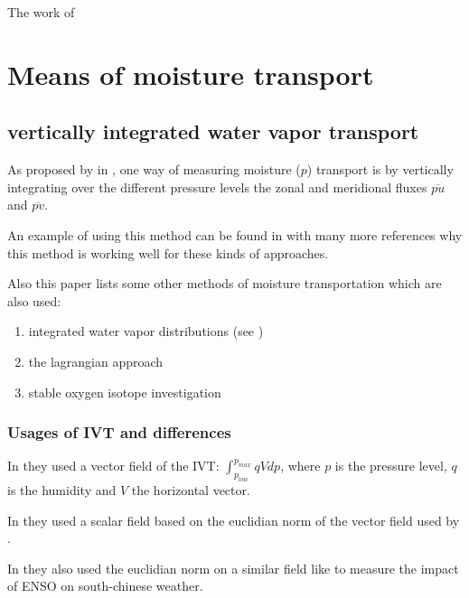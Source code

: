 The work of \citeauthor{precipitation_seasonality}

\section{Means of moisture transport}

\subsection{vertically integrated water vapor transport}

As proposed by \citeauthor{AProposedAlgorithmforMoistureFluxesfromAtmosphericRivers} in \cite{AProposedAlgorithmforMoistureFluxesfromAtmosphericRivers}, one way of measuring moisture ($p$) transport is by vertically integrating over the different pressure levels the zonal and meridional fluxes $\overline{pu}$ and $\overline{pv}$. 

An example of using this method can be found in \cite{Ayantobo2021IntegratedMT} with many more references why this method is working well for these kinds of approaches. 

Also this paper lists some other methods of moisture transportation which are also used:

\begin{enumerate}
  \item integrated water vapor distributions (see \cite{gimeno2014atmospheric_rivers_review})
  \item the lagrangian approach
  \item stable oxygen isotope investigation
\end{enumerate}

\subsubsection{Usages of IVT and differences}

In \cite{ralph2017dropsonde} they used a vector field of the IVT: $\int_{p_{low}}^{p_{max}} qV dp$, where $p$ is the pressure level, $q$ is the humidity and $V$ the horizontal vector.

In \cite{sousa2020north} they used a scalar field based on the euclidian norm of the vector field used by \cite{ralph2017dropsonde}.


In \cite{Ayantobo2021IntegratedMT} they also used the euclidian norm on a similar field like \cite{ralph2017dropsonde} to measure the impact of  ENSO on south-chinese weather.

